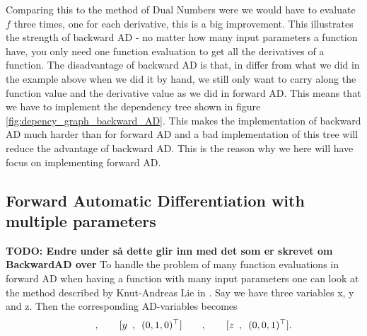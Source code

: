 Comparing this to the method of Dual Numbers were we would have to evaluate $f$ three times, one for each derivative, this is a big improvement. This illustrates the strength of backward AD - no matter how many input parameters a function have, you only need one function evaluation to get all the derivatives of a function. The disadvantage of backward AD is that, in differ from what we did in the example above when we did it by hand, we still only want to carry along the function value and the derivative value as we did in forward AD. This means that we have to implement the dependency tree shown in figure \ref{fig:depency_graph_backward_AD}. This makes the implementation of backward AD much harder than for forward AD and a bad implementation of this tree will reduce the advantage of backward AD. This is the reason why we here will have focus on implementing forward AD.

\subsection{Forward Automatic Differentiation with multiple parameters}
\textbf{TODO: Endre under så dette glir inn med det som er skrevet om BackwardAD over}
To handle the problem of many function evaluations in forward AD when having a function with many input parameters one can look at the method described by Knut-Andreas Lie in \emph{\citet{lieMrstUrl}}. Say we have three variables x, y and z. Then the corresponding AD-variables becomes
\begin{equation*}
    [x\hspace{0.5em},\hspace{0.5em}(1,0,0)^\top]\hspace{2em},\hspace{2em}
    [y\hspace{0.5em},\hspace{0.5em}(0,1,0)^\top]\hspace{2em},\hspace{2em}
    [z\hspace{0.5em},\hspace{0.5em}(0,0,1)^\top].
\end{equation*}

